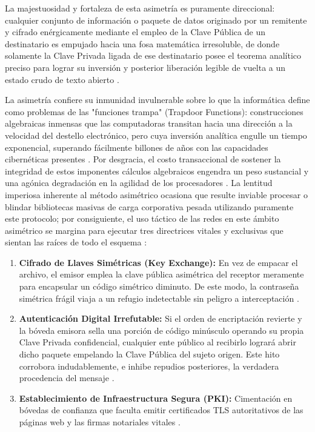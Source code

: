 \documentclass[a4paper,12pt]{article}
\begin{document}
La majestuosidad y fortaleza de esta asimetría es puramente direccional: cualquier conjunto de información o paquete de datos originado por un remitente y cifrado enérgicamente mediante el empleo de la Clave Pública de un destinatario es empujado hacia una fosa matemática irresoluble, de donde solamente la Clave Privada ligada de ese destinatario posee el teorema analítico preciso para lograr su inversión y posterior liberación legible de vuelta a un estado crudo de texto abierto \cite{aws_ssl}. 

La asimetría confiere su inmunidad invulnerable sobre lo que la informática define como problemas de las "funciones trampa" (Trapdoor Functions): construcciones algebraicas inmensas que las computadoras transitan hacia una dirección a la velocidad del destello electrónico, pero cuya inversión analítica engulle un tiempo exponencial, superando fácilmente billones de años con las capacidades cibernéticas presentes \cite{keyfactor_sym, ibm_crypto_use}. Por desgracia, el costo transaccional de sostener la integridad de estos imponentes cálculos algebraicos engendra un peso sustancial y una agónica degradación en la agilidad de los procesadores \cite{encrypt_sym}. La lentitud imperiosa inherente al método asimétrico ocasiona que resulte inviable procesar o blindar bibliotecas masivas de carga corporativa pesada utilizando puramente este protocolo; por consiguiente, el uso táctico de las redes en este ámbito asimétrico se margina para ejecutar tres directrices vitales y exclusivas que sientan las raíces de todo el esquema \cite{keyfactor_sym, encrypt_sym}:

\begin{enumerate}
    \item \textbf{Cifrado de Llaves Simétricas (Key Exchange):} En vez de empacar el archivo, el emisor emplea la clave pública asimétrica del receptor meramente para encapsular un código simétrico diminuto. De este modo, la contraseña simétrica frágil viaja a un refugio indetectable sin peligro a interceptación \cite{redes_crypto, ibm_crypto_use}.
    \item \textbf{Autenticación Digital Irrefutable:} Si el orden de encriptación revierte y la bóveda emisora sella una porción de código minúsculo operando su propia Clave Privada confidencial, cualquier ente público al recibirlo logrará abrir dicho paquete empelando la Clave Pública del sujeto origen. Este hito corrobora indudablemente, e inhibe repudios posteriores, la verdadera procedencia del mensaje \cite{redes_crypto, ibm_crypto_use}.
    \item \textbf{Establecimiento de Infraestructura Segura (PKI):} Cimentación en bóvedas de confianza que faculta emitir certificados TLS autoritativos de las páginas web y las firmas notariales vitales \cite{keyfactor_sym, aws_ssl}.
\end{enumerate}
\end{document}
